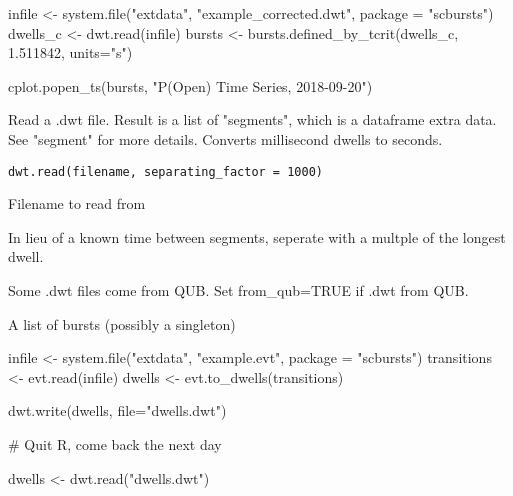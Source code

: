 \documentclass[letterpaper]{book}
\begin{document}
%
\begin{Examples}
\begin{ExampleCode}

infile <- system.file("extdata", "example_corrected.dwt", package = "scbursts")
dwells_c <- dwt.read(infile)
bursts <- bursts.defined_by_tcrit(dwells_c, 1.511842, units="s")

cplot.popen_ts(bursts, "P(Open) Time Series, 2018-09-20")

\end{ExampleCode}
\end{Examples}
%
\begin{Description}\relax
Read a .dwt file. Result is a list of "segments", which is a dataframe extra data. See "segment" for more details. Converts millisecond dwells to seconds.
\end{Description}
%
\begin{Usage}
\begin{verbatim}
dwt.read(filename, separating_factor = 1000)
\end{verbatim}
\end{Usage}
%
\begin{Arguments}
\begin{ldescription}
\item[\code{filename}] Filename to read from

\item[\code{separating\_factor}] In lieu of a known time between segments, seperate with a multple of the longest dwell.

\item[\code{from\_qub.}] Some .dwt files come from QUB. Set from\_qub=TRUE if .dwt from QUB.
\end{ldescription}
\end{Arguments}
%
\begin{Value}
A list of bursts (possibly a singleton)
\end{Value}
%
\begin{Examples}
\begin{ExampleCode}

infile <- system.file("extdata", "example.evt", package = "scbursts")
transitions <- evt.read(infile)
dwells <- evt.to_dwells(transitions)

dwt.write(dwells, file="dwells.dwt")

# Quit R, come back the next day

dwells <- dwt.read("dwells.dwt")

\end{ExampleCode}
\end{Examples}
\end{document}
